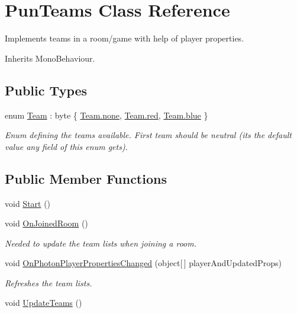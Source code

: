 \hypertarget{class_pun_teams}{}\section{Pun\+Teams Class Reference}
\label{class_pun_teams}


Implements teams in a room/game with help of player properties.  




Inherits Mono\+Behaviour.

\subsection*{Public Types}
\begin{DoxyCompactItemize}
\item 
enum \hyperlink{class_pun_teams_a933d84000474f43931805990b241a2a7}{Team} \+: byte \{ \hyperlink{class_pun_teams_a933d84000474f43931805990b241a2a7a334c4a4c42fdb79d7ebc3e73b517e6f8}{Team.\+none}, 
\hyperlink{class_pun_teams_a933d84000474f43931805990b241a2a7abda9643ac6601722a28f238714274da4}{Team.\+red}, 
\hyperlink{class_pun_teams_a933d84000474f43931805990b241a2a7a48d6215903dff56238e52e8891380c8f}{Team.\+blue}
 \}\begin{DoxyCompactList}\small\item\em Enum defining the teams available. First team should be neutral (it\textquotesingle{}s the default value any field of this enum gets).\end{DoxyCompactList}
\end{DoxyCompactItemize}
\subsection*{Public Member Functions}
\begin{DoxyCompactItemize}
\item 
void \hyperlink{class_pun_teams_a34a0c084356816754542a6299e5cad94}{Start} ()
\item 
void \hyperlink{class_pun_teams_a9b844f234f8c18f9336458f14c1e10d5}{On\+Joined\+Room} ()
\begin{DoxyCompactList}\small\item\em Needed to update the team lists when joining a room. \end{DoxyCompactList}\item 
void \hyperlink{class_pun_teams_a8478309a7c3a43014901f5ae2ed3ddc7}{On\+Photon\+Player\+Properties\+Changed} (object\mbox{[}$\,$\mbox{]} player\+And\+Updated\+Props)
\begin{DoxyCompactList}\small\item\em Refreshes the team lists. \end{DoxyCompactList}\item 
void \hyperlink{class_pun_teams_a03fd4ce6acb2bd7a4b02ac15858740a0}{Update\+Teams} ()
\end{DoxyCompactItemize}
